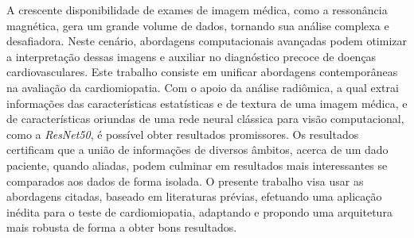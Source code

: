 \begin{resumo}

A crescente disponibilidade de exames de imagem médica, como a ressonância magnética, gera um grande volume de dados, tornando sua análise complexa e desafiadora. Neste cenário, abordagens computacionais avançadas podem otimizar a interpretação dessas imagens e auxiliar no diagnóstico precoce de doenças cardiovasculares. Este trabalho consiste em unificar abordagens contemporâneas na avaliação da cardiomiopatia. Com o apoio da análise radiômica, a qual extrai informações das características estatísticas e de textura de uma imagem médica, e de características oriundas de uma rede neural clássica para visão computacional, como a \textit{ResNet50}, é possível obter resultados promissores. Os resultados certificam que a união de informações de diversos âmbitos, acerca de um dado paciente, quando aliadas, podem culminar em resultados mais interessantes se comparados aos dados de forma isolada. O presente trabalho visa usar as abordagens citadas, baseado em literaturas prévias, efetuando uma aplicação inédita para o teste de cardiomiopatia, adaptando e propondo uma arquitetura mais robusta de forma a obter bons resultados.



 
\end{resumo}